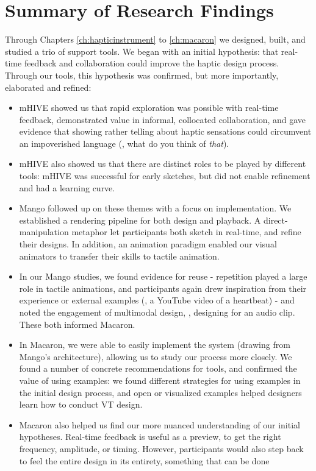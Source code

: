 \section{Summary of Research Findings}
Through Chapters \ref{ch:hapticinstrument} to \ref{ch:macaron} we designed, built, and studied a trio of \haxd support tools.
We began with an initial hypothesis: that real-time feedback and collaboration could improve the haptic design process.
Through our tools, this hypothesis was confirmed, but more importantly, elaborated and refined:
\begin{itemize}
	\item mHIVE showed us that rapid exploration was possible with real-time feedback, demonstrated value in informal, collocated collaboration, and gave evidence that showing rather telling about haptic sensations could circumvent an impoverished language (\eg, what do you think of \emph{that}).
	\item mHIVE also showed us that there are distinct roles to be played by different tools: mHIVE was successful for early sketches, but did not enable refinement and had a learning curve.
	\item Mango followed up on these themes with a focus on implementation. We established a rendering pipeline for both design and playback. A direct-manipulation metaphor let participants both sketch in real-time, and refine their designs. In addition, an animation paradigm enabled our visual animators to transfer their skills to tactile animation.
	\item In our Mango studies, we found evidence for reuse - repetition played a large role in tactile animations, and participants again drew inspiration from their experience or external examples (\eg, a YouTube video of a heartbeat) - and noted the engagement of multimodal design, \eg, designing for an audio clip. These both informed Macaron.
	\item In Macaron, we were able to easily implement the system (drawing from Mango's architecture), allowing us to study our process more closely. We found a number of concrete recommendations for \haxd tools, and confirmed the value of using examples: we found different strategies for using examples in the initial design process, and open or visualized examples helped designers learn how to conduct VT design.
	\item Macaron also helped us find our more nuanced understanding of our initial hypotheses. Real-time feedback is useful as a preview, to get the right frequency, amplitude, or timing. However, participants would also step back to feel the entire design in its entirety, something that can be done
\end{itemize}

